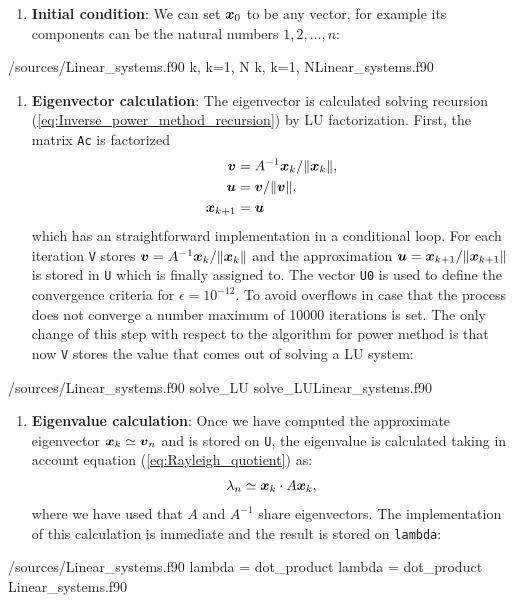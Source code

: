     
     \begin{enumerate}[resume]
     	\item \textbf{Initial condition}: We can set $\boldsymbol{x}_0$ to be any vector, for example its components can be the natural numbers $1,2,\ldots,n$:
     \end{enumerate}
     \listings
     {\home/sources/Linear_systems.f90}
     {k, k=1, N}
     {k, k=1, N}{Linear_systems.f90}
     
     \begin{enumerate}[resume]
     	\item \textbf{Eigenvector calculation}: The eigenvector is calculated solving recursion (\ref{eq:Inverse_power_method_recursion}) by LU factorization. First, the matrix \verb|Ac| is factorized
     	\begin{align}
     	\boldsymbol{v} 
     	& 
     	= A^{-1} \boldsymbol{x}_{k}/\norm{\boldsymbol{x}_{k}}, 
     	\\
     	\boldsymbol{u} 
     	& 
     	= \boldsymbol{v} /\norm{\boldsymbol{v}}, 
     	\\
     	\boldsymbol{x}_{k+1}
     	& 
     	= \boldsymbol{u} 
     	\end{align}
     	which has an straightforward implementation in a conditional loop. For each iteration
     	\verb|V| stores $\boldsymbol{v} = A^{-1}\boldsymbol{x}_{k}/\norm{ \boldsymbol{x}_{k}}$ and the approximation $\boldsymbol{u}=\boldsymbol{x}_{k+1}/\norm{ \boldsymbol{x}_{k+1}}$ is stored in \verb|U| which is finally assigned to. The vector \verb|U0| is used to define the convergence criteria for $\epsilon=10^{-12}$. To avoid overflows in case that the process does not converge a number maximum of 10000 iterations is set. The only change of this step with respect to the algorithm for power method is that now \verb|V| stores the value that comes out of solving a LU system: 
     	
     \end{enumerate}
     \vspace{0.5cm} 
     \listings
     {\home/sources/Linear_systems.f90}
     {solve_LU}
     {solve_LU}{Linear_systems.f90}
     
     \begin{enumerate}[resume]
     	\item \textbf{Eigenvalue calculation}: Once we have computed the approximate eigenvector $\boldsymbol{x}_{k}\simeq\boldsymbol{v}_n$ and is stored on \verb|U|, the eigenvalue is calculated taking in account equation (\ref{eq:Rayleigh_quotient}) as:
     	\begin{align}
     	\lambda_n \simeq \boldsymbol{x}_{k}\cdot A\boldsymbol{x}_{k},
     	\end{align}
     	where we have used that $A$ and $A^{-1}$ share eigenvectors. The implementation of this calculation is immediate and the result is stored on \verb|lambda|:
     \end{enumerate}
     \vspace{0.5cm} 
     \listings
     {\home/sources/Linear_systems.f90}
     {lambda = dot_product}
     {lambda = dot_product}
     {Linear_systems.f90}
  
